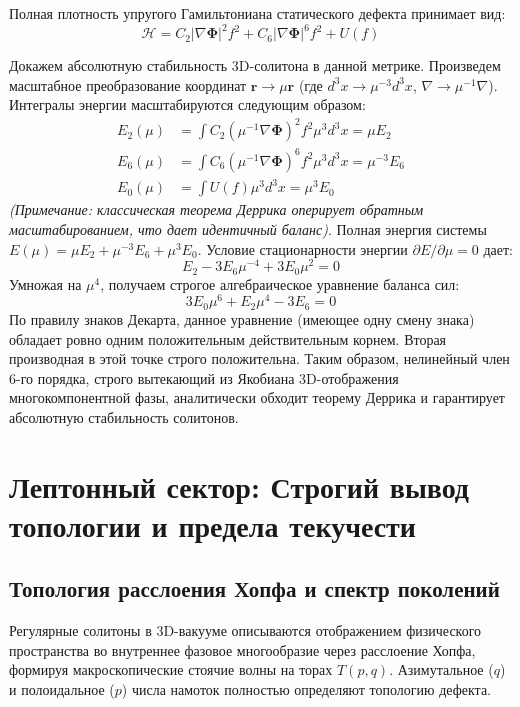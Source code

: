 \documentclass[12pt,a4paper]{article}
\begin{document}
Полная плотность упругого Гамильтониана статического дефекта принимает вид:
\begin{equation}
	\mathcal{H} = C_2 |\nabla \boldsymbol{\Phi}|^2 f^2 + C_6 |\nabla \boldsymbol{\Phi}|^6 f^2 + U(f)
\end{equation}

Докажем абсолютную стабильность 3D-солитона в данной метрике. Произведем масштабное преобразование координат $\mathbf{r} \to \mu\mathbf{r}$ (где $d^3x \to \mu^{-3}d^3x$, $\nabla \to \mu^{-1}\nabla$). Интегралы энергии масштабируются следующим образом:
\begin{align}
	E_2(\mu) &= \int C_2 (\mu^{-1} \nabla \boldsymbol{\Phi})^2 f^2 \mu^3 d^3x = \mu E_2 \\
	E_6(\mu) &= \int C_6 (\mu^{-1} \nabla \boldsymbol{\Phi})^6 f^2 \mu^3 d^3x = \mu^{-3} E_6 \\
	E_0(\mu) &= \int U(f) \mu^3 d^3x = \mu^3 E_0
\end{align}
\textit{(Примечание: классическая теорема Деррика оперирует обратным масштабированием, что дает идентичный баланс)}.
Полная энергия системы $E(\mu) = \mu E_2 + \mu^{-3} E_6 + \mu^3 E_0$. Условие стационарности энергии $\partial E / \partial \mu = 0$ дает:
\begin{equation}
	E_2 - 3 E_6 \mu^{-4} + 3 E_0 \mu^2 = 0
\end{equation}
Умножая на $\mu^4$, получаем строгое алгебраическое уравнение баланса сил:
\begin{equation}
	3 E_0 \mu^6 + E_2 \mu^4 - 3 E_6 = 0
\end{equation}
По правилу знаков Декарта, данное уравнение (имеющее одну смену знака) обладает ровно одним положительным действительным корнем. Вторая производная в этой точке строго положительна. Таким образом, нелинейный член 6-го порядка, строго вытекающий из Якобиана 3D-отображения многокомпонентной фазы, аналитически обходит теорему Деррика и гарантирует абсолютную стабильность солитонов.
	
	\section{Лептонный сектор: Строгий вывод топологии и предела текучести}
	
	\subsection{Топология расслоения Хопфа и спектр поколений}
	Регулярные солитоны в 3D-вакууме описываются отображением физического пространства во внутреннее фазовое многообразие через расслоение Хопфа, формируя макроскопические стоячие волны на торах $T(p,q)$. Азимутальное ($q$) и полоидальное ($p$) числа намоток полностью определяют топологию дефекта.
	
\end{document}
